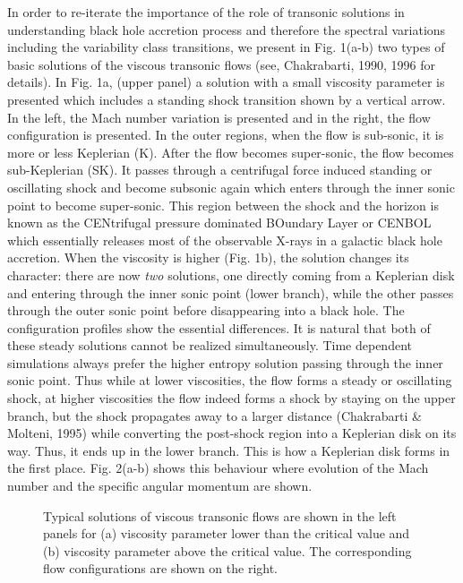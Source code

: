 \documentclass[referee]{cjaa}           %
\begin{document}
In order to re-iterate the importance of the role of transonic solutions in understanding 
black hole accretion process and therefore the spectral variations including the 
variability class transitions, we present in Fig. 1(a-b) two types of basic solutions of the viscous
transonic flows (see, Chakrabarti, 1990, 1996 for details). In Fig. 1a, (upper panel) a solution with a small viscosity
parameter is presented which includes a standing shock transition shown by a vertical arrow. In the left, 
the Mach number variation is presented and in the right, the flow configuration is presented. 
In the outer regions, when the flow is sub-sonic, it is more or less Keplerian (K). After the flow 
becomes super-sonic, the flow becomes sub-Keplerian (SK). It passes through a centrifugal force
induced standing or oscillating shock and become subsonic again which enters through the inner sonic point
to become super-sonic. This region between the shock and the horizon is known as the  
CENtrifugal pressure dominated BOundary Layer or CENBOL which essentially releases most of the observable 
X-rays in a galactic black hole accretion. When the viscosity is higher (Fig. 1b), the solution changes its
character: there are now {\it two} solutions, one directly coming from a Keplerian disk and entering through the
inner sonic point (lower branch), while the other passes through the outer sonic point before disappearing into a black hole.
The configuration profiles show the essential differences. It is natural that both of these steady solutions
cannot be realized simultaneously. Time dependent simulations always prefer the higher entropy  
solution passing through the inner sonic point. Thus while at lower viscosities, the flow
forms a steady or oscillating shock, at higher viscosities the flow indeed forms a shock by staying on the
upper branch, but the shock propagates 
away to a larger distance (Chakrabarti \& Molteni, 1995) while converting the post-shock region 
into a Keplerian disk on its way. Thus, it ends up in the lower branch. 
This is how a Keplerian disk forms in the first place. Fig. 2(a-b) shows this behaviour where evolution of the Mach 
number and the specific angular momentum are shown. 

\begin{figure}
   \begin{center}
{\vskip 0.0cm
   \mbox{\textwidth{}\textwidth{}}}
\vskip -7.0cm
   \caption{Typical solutions of viscous transonic flows are shown in the left panels
for (a) viscosity parameter lower than the critical value and (b) viscosity parameter above
the critical value. The corresponding flow configurations are shown on the right.
}
   \end{center}
\end{figure}
\end{document}
